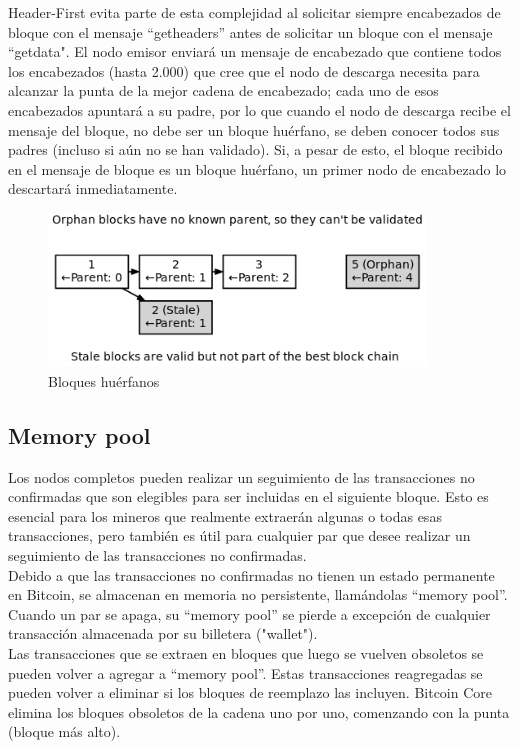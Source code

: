 \documentclass[11pt,a4paper]{article}
\begin{document}
Header-First evita parte de esta complejidad al solicitar siempre encabezados de bloque con el mensaje ``getheaders'' antes de solicitar un bloque con el mensaje ``getdata". El nodo emisor enviará un mensaje de encabezado que contiene todos los encabezados (hasta 2.000) que cree que el nodo de descarga necesita para alcanzar la punta de la mejor cadena de encabezado; cada uno de esos encabezados apuntará a su padre, por lo que cuando el nodo de descarga recibe el mensaje del bloque, no debe ser un bloque huérfano, se deben conocer todos sus padres (incluso si aún no se han validado). Si, a pesar de esto, el bloque recibido en el mensaje de bloque es un bloque huérfano, un primer nodo de encabezado lo descartará inmediatamente.

\begin{figure}[h]
	\includegraphics[width=10cm]{Image4.png}
	\centering		
	\caption{Bloques huérfanos}
	\label{p5}
\end{figure}

\subsection{Memory pool}

Los nodos completos pueden realizar un seguimiento de las transacciones no confirmadas que son elegibles para ser incluidas en el siguiente bloque. Esto es esencial para los mineros que realmente extraerán algunas o todas esas transacciones, pero también es útil para cualquier par que desee realizar un seguimiento de las transacciones no confirmadas.\\

Debido a que las transacciones no confirmadas no tienen un estado permanente en Bitcoin, se almacenan en memoria no persistente, llamándolas ``memory pool''. Cuando un par se apaga, su ``memory pool'' se pierde a excepción de cualquier transacción almacenada por su billetera ("wallet").\\

Las transacciones que se extraen en bloques que luego se vuelven obsoletos se pueden volver a agregar a ``memory pool''. Estas transacciones reagregadas se pueden volver a eliminar si los bloques de reemplazo las incluyen. Bitcoin Core elimina los bloques obsoletos de la cadena uno por uno, comenzando con la punta (bloque más alto).
\end{document}
